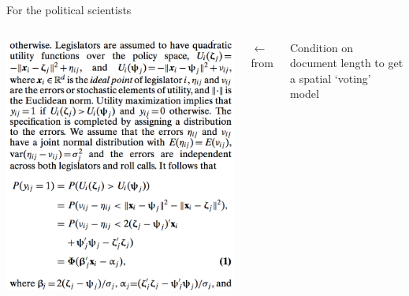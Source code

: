 \documentclass{hertieteaching}
\begin{document}
\begin{frame}{For the political scientists}

\begin{columns}[T,onlytextwidth]
\centerline{\includegraphics[scale=0.45]{pictures/ideal}}


$\longleftarrow$ from \textcite{Clinton.etal2004}
\medskip

Condition on document length to get a spatial `voting' model \parencite[via the `Multinomial-Poisson' transform',][] {Baker1994,Lang2004}

\end{columns}
	
\end{frame}
\end{document}
